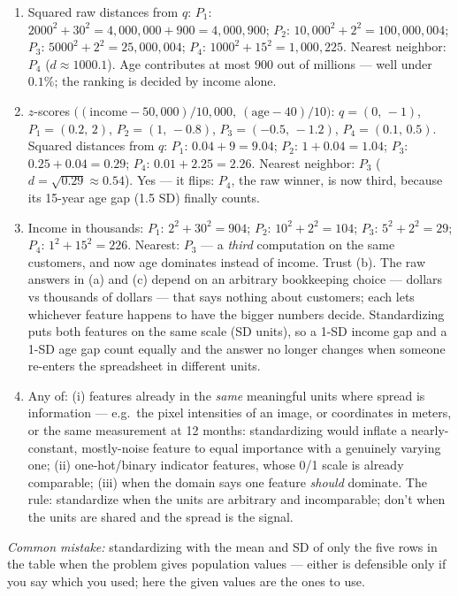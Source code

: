 \documentclass[
  11pt,
]{article}
\begin{document}
\begin{solutionbox}

\begin{enumerate}
\def\labelenumi{(\alph{enumi})}
\item
  Squared raw distances from \(q\): \(P_1\):
  \(2000^2 + 30^2 = 4{,}000{,}000 + 900 = 4{,}000{,}900\); \(P_2\):
  \(10{,}000^2 + 2^2 = 100{,}000{,}004\); \(P_3\):
  \(5000^2 + 2^2 = 25{,}000{,}004\); \(P_4\):
  \(1000^2 + 15^2 = 1{,}000{,}225\). Nearest neighbor: \textbf{\(P_4\)}
  (\(d\approx1000.1\)). Age contributes at most \(900\) out of millions
  --- well under \(0.1\%\); the ranking is decided by income alone.
\item
  \(z\)-scores
  \(\big((\text{income}-50{,}000)/10{,}000,\ (\text{age}-40)/10\big)\):
  \(q = (0,\,-1)\), \(P_1 = (0.2,\,2)\), \(P_2 = (1,\,-0.8)\),
  \(P_3 = (-0.5,\,-1.2)\), \(P_4 = (0.1,\,0.5)\). Squared distances from
  \(q\): \(P_1\): \(0.04 + 9 = 9.04\); \(P_2\): \(1 + 0.04 = 1.04\);
  \(P_3\): \(0.25 + 0.04 = 0.29\); \(P_4\): \(0.01 + 2.25 = 2.26\).
  Nearest neighbor: \textbf{\(P_3\)} (\(d = \sqrt{0.29}\approx0.54\)).
  Yes --- it flips: \(P_4\), the raw winner, is now third, because its
  15-year age gap (1.5 SD) finally counts.
\item
  Income in thousands: \(P_1\): \(2^2 + 30^2 = 904\); \(P_2\):
  \(10^2 + 2^2 = 104\); \(P_3\): \(5^2+2^2 = 29\); \(P_4\):
  \(1^2 + 15^2 = 226\). Nearest: \textbf{\(P_3\)} --- a \emph{third}
  computation on the same customers, and now age dominates instead of
  income. Trust (b). The raw answers in (a) and (c) depend on an
  arbitrary bookkeeping choice --- dollars vs thousands of dollars ---
  that says nothing about customers; each lets whichever feature happens
  to have the bigger numbers decide. Standardizing puts both features on
  the same scale (SD units), so a 1-SD income gap and a 1-SD age gap
  count equally and the answer no longer changes when someone re-enters
  the spreadsheet in different units.
\item
  Any of: (i) features already in the \emph{same} meaningful units where
  spread is information --- e.g.~the pixel intensities of an image, or
  coordinates in meters, or the same measurement at 12 months:
  standardizing would inflate a nearly-constant, mostly-noise feature to
  equal importance with a genuinely varying one; (ii) one-hot/binary
  indicator features, whose 0/1 scale is already comparable; (iii) when
  the domain says one feature \emph{should} dominate. The rule:
  standardize when the units are arbitrary and incomparable; don't when
  the units are shared and the spread is the signal.
\end{enumerate}

\emph{Common mistake:} standardizing with the mean and SD of only the
five rows in the table when the problem gives population values ---
either is defensible only if you say which you used; here the given
values are the ones to use.

\end{solutionbox}
\end{document}
